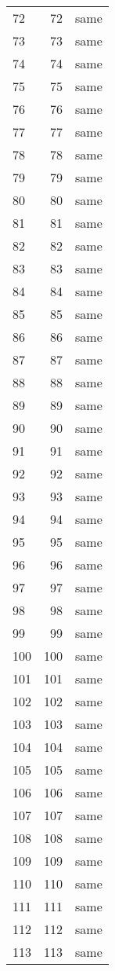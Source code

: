 \documentclass{article}%
\begin{document}
\begin{longtable}{lrl}
72  &   72 &  same \\
73  &   73 &  same \\
74  &   74 &  same \\
75  &   75 &  same \\
76  &   76 &  same \\
77  &   77 &  same \\
78  &   78 &  same \\
79  &   79 &  same \\
80  &   80 &  same \\
81  &   81 &  same \\
82  &   82 &  same \\
83  &   83 &  same \\
84  &   84 &  same \\
85  &   85 &  same \\
86  &   86 &  same \\
87  &   87 &  same \\
88  &   88 &  same \\
89  &   89 &  same \\
90  &   90 &  same \\
91  &   91 &  same \\
92  &   92 &  same \\
93  &   93 &  same \\
94  &   94 &  same \\
95  &   95 &  same \\
96  &   96 &  same \\
97  &   97 &  same \\
98  &   98 &  same \\
99  &   99 &  same \\
100 &  100 &  same \\
101 &  101 &  same \\
102 &  102 &  same \\
103 &  103 &  same \\
104 &  104 &  same \\
105 &  105 &  same \\
106 &  106 &  same \\
107 &  107 &  same \\
108 &  108 &  same \\
109 &  109 &  same \\
110 &  110 &  same \\
111 &  111 &  same \\
112 &  112 &  same \\
113 &  113 &  same \\

\end{longtable}
\end{document}
